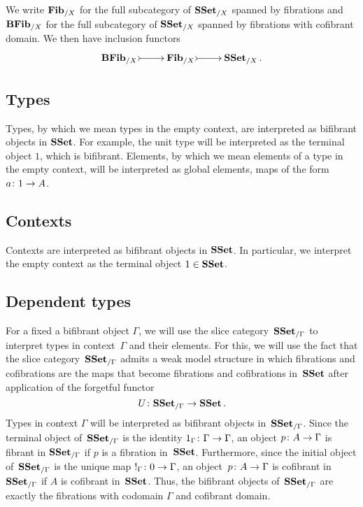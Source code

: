 \documentclass[reqno,10pt,a4paper,oneside,draft]{amsart}
\begin{document}
We write $\mathbf{Fib}_{/X}$ for the full subcategory of $\mathbf{SSet}_{/X}$ spanned by fibrations and $\mathbf{BFib}_{/X}$ for the full subcategory of  $\mathbf{SSet}_{/X}$ spanned by fibrations with cofibrant domain. We then have inclusion
functors
\[
\xymatrix{
\BFFib_{/X} \ar@{>->}[r] &
\FFib_{/X} \ar@{>->}[r] &
\SSet_{/X} \, .}
\]






\subsection*{Types}

Types, by which we mean types in the empty context, are interpreted as bifibrant objects in $\mathbf{SSet}$. For example, the unit type will be interpreted as the terminal object $1$, which is bifibrant. Elements, by which we mean elements of a type in the empty context, will be interpreted as global elements, \ie maps of the form $a \colon 1 \to A$.


\subsection*{Contexts}

Contexts are interpreted as bifibrant objects in $\mathbf{SSet}$. In particular, we interpret the empty context as the terminal object $1 \in \mathbf{SSet}$. 

\subsection*{Dependent types} 

For a fixed a bifibrant object $\Gamma$, we will use the slice category~$\mathbf{SSet}_{/\Gamma}$
to interpret types in context~$\Gamma$ and their elements. For this, we will use the fact that the slice category~$\mathbf{SSet}_{/\Gamma}$ admits a weak model structure in which fibrations and cofibrations are the maps that become fibrations and cofibrations in~$\mathbf{SSet}$ after application of the forgetful functor 
\[
U \colon \mathbf{SSet}_{/\Gamma} \to \mathbf{SSet} \, .
\] 
Types in context $\Gamma$ will be interpreted as bifibrant objects in~$\mathbf{SSet}_{/\Gamma}$. Since the terminal object of~$\mathbf{SSet}_{/\Gamma}$ is the identity $1_\Gamma \colon \Gamma \to \Gamma$, an object $p \colon A \to \Gamma$ is fibrant in $\mathbf{SSet}_{/\Gamma}$ if $p$ is a fibration in~$\mathbf{SSet}$. Furthermore, since the initial object of~$\mathbf{SSet}_{/\Gamma}$ is the unique map
$!_\Gamma \colon 0 \to \Gamma$, an object~$p \colon A \to \Gamma$ is cofibrant in~$\mathbf{SSet}_{/\Gamma}$ if $A$ is cofibrant in~$\mathbf{SSet}$.
Thus, the bifibrant objects of~$\mathbf{SSet}_{/\Gamma}$ are exactly the fibrations with codomain $\Gamma$ and cofibrant domain.
\end{document}
